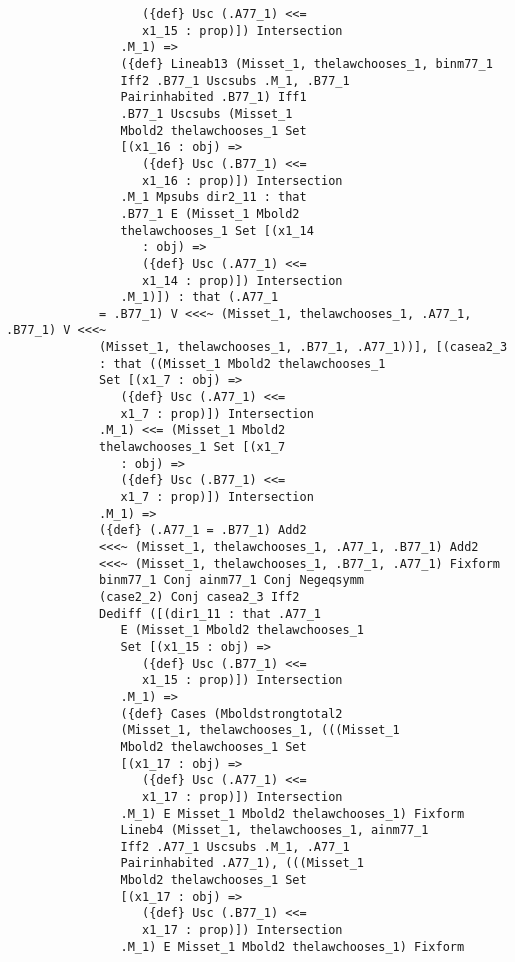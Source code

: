 \documentclass[12pt]{article}
\begin{document}
\begin{verbatim}
                   ({def} Usc (.A77_1) <<= 
                   x1_15 : prop)]) Intersection 
                .M_1) => 
                ({def} Lineab13 (Misset_1, thelawchooses_1, binm77_1 
                Iff2 .B77_1 Uscsubs .M_1, .B77_1 
                Pairinhabited .B77_1) Iff1 
                .B77_1 Uscsubs (Misset_1 
                Mbold2 thelawchooses_1 Set 
                [(x1_16 : obj) => 
                   ({def} Usc (.B77_1) <<= 
                   x1_16 : prop)]) Intersection 
                .M_1 Mpsubs dir2_11 : that 
                .B77_1 E (Misset_1 Mbold2 
                thelawchooses_1 Set [(x1_14 
                   : obj) => 
                   ({def} Usc (.A77_1) <<= 
                   x1_14 : prop)]) Intersection 
                .M_1)]) : that (.A77_1 
             = .B77_1) V <<<~ (Misset_1, thelawchooses_1, .A77_1, .B77_1) V <<<~ 
             (Misset_1, thelawchooses_1, .B77_1, .A77_1))], [(casea2_3 
             : that ((Misset_1 Mbold2 thelawchooses_1 
             Set [(x1_7 : obj) => 
                ({def} Usc (.A77_1) <<= 
                x1_7 : prop)]) Intersection 
             .M_1) <<= (Misset_1 Mbold2 
             thelawchooses_1 Set [(x1_7 
                : obj) => 
                ({def} Usc (.B77_1) <<= 
                x1_7 : prop)]) Intersection 
             .M_1) => 
             ({def} (.A77_1 = .B77_1) Add2 
             <<<~ (Misset_1, thelawchooses_1, .A77_1, .B77_1) Add2 
             <<<~ (Misset_1, thelawchooses_1, .B77_1, .A77_1) Fixform 
             binm77_1 Conj ainm77_1 Conj Negeqsymm 
             (case2_2) Conj casea2_3 Iff2 
             Dediff ([(dir1_11 : that .A77_1 
                E (Misset_1 Mbold2 thelawchooses_1 
                Set [(x1_15 : obj) => 
                   ({def} Usc (.B77_1) <<= 
                   x1_15 : prop)]) Intersection 
                .M_1) => 
                ({def} Cases (Mboldstrongtotal2 
                (Misset_1, thelawchooses_1, (((Misset_1 
                Mbold2 thelawchooses_1 Set 
                [(x1_17 : obj) => 
                   ({def} Usc (.A77_1) <<= 
                   x1_17 : prop)]) Intersection 
                .M_1) E Misset_1 Mbold2 thelawchooses_1) Fixform 
                Lineb4 (Misset_1, thelawchooses_1, ainm77_1 
                Iff2 .A77_1 Uscsubs .M_1, .A77_1 
                Pairinhabited .A77_1), (((Misset_1 
                Mbold2 thelawchooses_1 Set 
                [(x1_17 : obj) => 
                   ({def} Usc (.B77_1) <<= 
                   x1_17 : prop)]) Intersection 
                .M_1) E Misset_1 Mbold2 thelawchooses_1) Fixform 

\end{verbatim}
\end{document}
